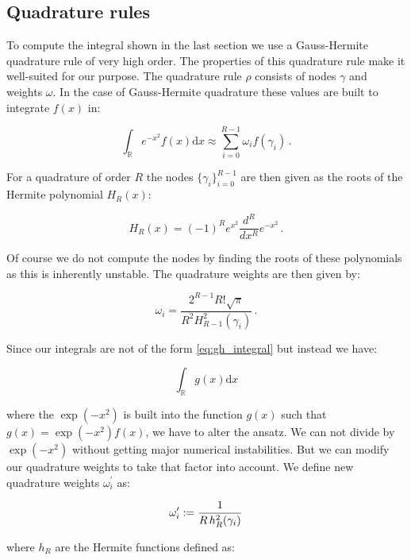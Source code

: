 \subsection{Quadrature rules}


To compute the integral shown in the last section we use a Gauss-Hermite
quadrature rule of very high order. The properties of this quadrature rule
make it well-suited for our purpose. The quadrature rule $\rho$ consists of
nodes $\gamma$ and weights $\omega$. In the case of Gauss-Hermite quadrature
these values are built to integrate $f(x)$ in:

\begin{equation} \label{eq:gh_integral}
  \int_{\mathbb{R}} e^{-x^2} f(x) \mathrm{d}x \approx \sum_{i=0}^{R-1} \omega_i f(\gamma_i) \,.
\end{equation}

For a quadrature of order $R$ the nodes $\{\gamma_i\}_{i=0}^{R-1}$ are then
given as the roots of the Hermite polynomial $H_R(x)$:

\begin{equation*}
  H_R(x) = (-1)^R e^{x^2} \frac{d^R}{dx^R} e^{-x^2} \,.
\end{equation*}

Of course we do not compute the nodes by finding the roots of these polynomials
as this is inherently unstable. The quadrature weights are then given by:

\begin{equation*}
  \omega_i = \frac{2^{R-1} R! \sqrt{\pi}} {R^2 H_{R-1}^2(\gamma_i)} \,.
\end{equation*}

Since our integrals are not of the form \eqref{eq:gh_integral}
but instead we have:

\begin{equation}
  \int_{\mathbb{R}} g(x) \mathrm{d}x
\end{equation}

where the $\exp(-x^2)$ is built into the function $g(x)$ such that
$g(x) = \exp(-x^2) f(x)$, we have to alter the ansatz. We can not divide
by $\exp(-x^2)$ without getting major numerical instabilities. But we can
modify our quadrature weights to take that factor into account. We define
new quadrature weights $\omega_i^\prime$ as:

\begin{equation*}
  \omega_i^\prime := \frac{1}{R \, h_R^2(\gamma_i)}
\end{equation*}

where $h_R$ are the Hermite functions defined as:

